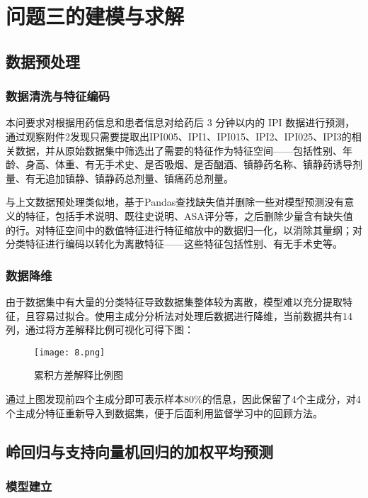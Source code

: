 \section{问题三的建模与求解}



\subsection{数据预处理}

\subsubsection{数据清洗与特征编码}

本问要求对根据用药信息和患者信息对给药后 3 分钟以内的 IPI 数据进行预测，通过观察附件2发现只需要提取出IPI005、IPI1、IPI015、IPI2、IPI025、IPI3的相关数据，并从原始数据集中筛选出了需要的特征作为特征空间——包括性别、年龄、身高、体重、有无手术史、是否吸烟、是否酗酒、镇静药名称、镇静药诱导剂量、有无追加镇静、镇静药总剂量、镇痛药总剂量。

与上文数据预处理类似地，基于Pandas查找缺失值并删除一些对模型预测没有意义的特征，包括手术说明、既往史说明、ASA评分等，之后删除少量含有缺失值的行。对特征空间中的数值特征进行特征缩放中的数据归一化，以消除其量纲；对分类特征进行编码以转化为离散特征——这些特征包括性别、有无手术史等。

\subsubsection{数据降维}

由于数据集中有大量的分类特征导致数据集整体较为离散，模型难以充分提取特征，且容易过拟合。使用主成分分析法对处理后数据进行降维，当前数据共有14列，通过将方差解释比例可视化可得下图：

\begin{figure}[H] %
	\centering %
	\texttt{[image: 8.png]} 
	\caption{累积方差解释比例图} 
	\label{Fig.main8} 
\end{figure}

通过上图发现前四个主成分即可表示样本80\%的信息，因此保留了4个主成分，对4个主成分特征重新导入到数据集，便于后面利用监督学习中的回顾方法。

\subsection{岭回归与支持向量机回归的加权平均预测}


\subsubsection{模型建立}

